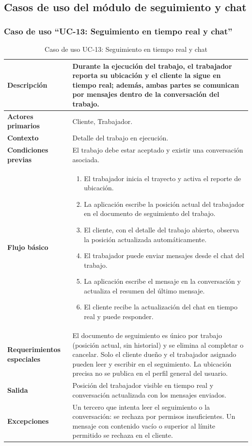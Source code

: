 \documentclass[doc,12pt,a4paper]{apa7}
\begin{document}
\subsection{Casos de uso del módulo de seguimiento y chat}

\subsubsection{Caso de uso ``UC-13: Seguimiento en tiempo real y chat''}

\begin{longtable}{|P{3.3cm}|L{11.2cm}|}
\caption{Caso de uso UC-13: Seguimiento en tiempo real y chat}\\
\hline
\textbf{Descripción} & Durante la ejecución del trabajo, el trabajador reporta su ubicación y el cliente la sigue en tiempo real; además, ambas partes se comunican por mensajes dentro de la conversación del trabajo. \\ \hline
\textbf{Actores primarios} & Cliente, Trabajador. \\ \hline
\textbf{Contexto} & Detalle del trabajo en ejecución. \\ \hline
\textbf{Condiciones previas} & El trabajo debe estar aceptado y existir una conversación asociada. \\ \hline
\textbf{Flujo básico} &
\begin{enumerate}
    \item El trabajador inicia el trayecto y activa el reporte de ubicación.
    \item La aplicación escribe la posición actual del trabajador en el documento de seguimiento del trabajo.
    \item El cliente, con el detalle del trabajo abierto, observa la posición actualizada automáticamente.
    \item El trabajador puede enviar mensajes desde el chat del trabajo.
    \item La aplicación escribe el mensaje en la conversación y actualiza el resumen del último mensaje.
    \item El cliente recibe la actualización del chat en tiempo real y puede responder.
\end{enumerate} \\ \hline
\textbf{Requerimientos especiales} & El documento de seguimiento es único por trabajo (posición actual, sin historial) y se elimina al completar o cancelar. Solo el cliente dueño y el trabajador asignado pueden leer y escribir en el seguimiento. La ubicación precisa no se publica en el perfil general del usuario. \\ \hline
\textbf{Salida} & Posición del trabajador visible en tiempo real y conversación actualizada con los mensajes enviados. \\ \hline
\textbf{Excepciones} & Un tercero que intenta leer el seguimiento o la conversación: se rechaza por permisos insuficientes. Un mensaje con contenido vacío o superior al límite permitido se rechaza en el cliente. \\ \hline
\end{longtable}
\end{document}
